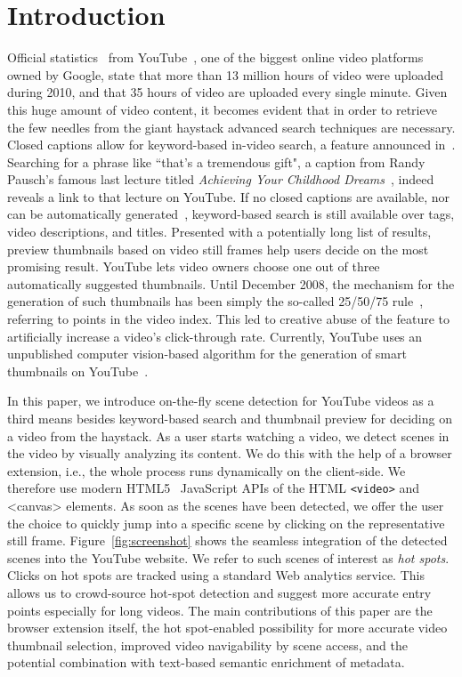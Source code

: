 \documentclass[10pt,twocolumn,letterpaper]{article}
\begin{document}
\section{Introduction}
Official statistics~\cite{youtube:stats} from YouTube~\cite{youtube}, one of the biggest online video platforms owned by Google, state that more than 13 million hours of video were uploaded during 2010, and that 35 hours of video are uploaded every single minute. Given this huge amount of video content, it becomes evident that in order to retrieve the few needles from the giant haystack advanced search techniques are necessary. Closed captions allow for keyword-based in-video search, a feature announced in~\cite{googlevideo}. Searching for a phrase like ``that's a tremendous gift", a caption from Randy Pausch's famous last lecture titled \emph{Achieving Your Childhood Dreams}~\cite{pausch}, indeed reveals a link to that lecture on YouTube. If no closed captions are available, nor can be automatically generated~\cite{youtubecaptions}, keyword-based search is still available over tags, video descriptions, and titles. Presented with a potentially long list of results, preview thumbnails based on video still frames help users decide on the most promising result. YouTube lets video owners choose one out of three automatically suggested thumbnails. Until December 2008, the mechanism for the generation of such thumbnails has been simply the so-called 25/50/75 rule~\cite{youtuberule}, referring to points in the video index. This led to creative abuse of the feature to artificially increase a video's click-through rate. Currently, YouTube uses an unpublished computer vision-based algorithm for the generation of smart thumbnails on YouTube~\cite{googleresearch}.

In this paper, we introduce on-the-fly scene detection for YouTube videos as a third means besides keyword-based search and thumbnail preview for deciding on a video from the haystack. As a user starts watching a video, we detect scenes in the video by visually analyzing its content. We do this with the help of a browser extension, i.e., the whole process runs dynamically on the client-side. We therefore use modern HTML5~\cite{w3c_html5} JavaScript APIs of the HTML \texttt{<video>} and {<canvas>} elements. As soon as the scenes have been detected, we offer the user the choice to quickly jump into a specific scene by clicking on the representative still frame. Figure~\ref{fig:screenshot} shows the seamless integration of the detected scenes into the YouTube website. We refer to such scenes of interest as \emph{hot spots}. Clicks on hot spots are tracked using a standard Web analytics service. This allows us to crowd-source hot-spot detection and suggest more accurate entry points especially for long videos. The main contributions of this paper are the browser extension itself, the hot spot-enabled possibility for more accurate video thumbnail selection, improved video navigability by scene access, and the potential combination with text-based semantic enrichment of metadata.
\end{document}

